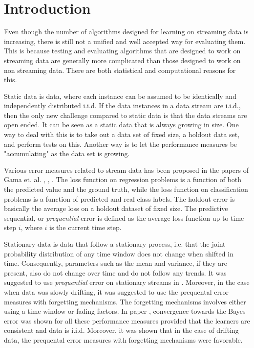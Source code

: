 \section{Introduction}

Even though the number of algorithms designed for learning on streaming data is increasing, there is still not a unified and well accepted way for evaluating them.  This is because testing and evaluating algorithms that are designed to work on streaming data are generally more complicated than those designed to work on non streaming data.  There are both statistical and computational reasons for this.  

Static data is data, where each instance can be assumed to be identically and independently distributed i.i.d. 
If the data instances in a data stream are i.i.d., then the only new challenge compared to static data is that the data streams are open ended.  It can be seen as a static data that is always growing in size.  One way to deal with this is to take out a data set of fixed size, a holdout data set, and perform tests on this.  Another way is to let the performance measures be "accumulating" as the data set is growing.  

Various error measures related to stream data has been proposed in the papers of Gama et. al. \cite{Gam09}, \cite{Gam09_2}, \cite{Gam13}.  The loss function on regression problems is a function of both the predicted value and the ground truth, while the loss function on classification problems is a function of predicted and real class labels.  The holdout error is basically the average loss on a holdout dataset of fixed size.  The predictive sequential, or \emph{prequential} error is defined as the average loss function up to time step $i$, where $i$ is the current time step. 

Stationary data is data that follow a stationary process, i.e. that the joint probability distribution of any time window does not change when shifted in time. Consequently, parameters such as the mean and variance, if they are present, also do not change over time and do not follow any trends.  It was suggested to use  \emph{prequential} error on stationary streams in \cite{Gam13}.  Moreover, in the case when data was slowly drifting, it was suggested to use the prequental error measures with forgetting mechanisms. The forgetting mechanisms involves either using a time window or fading factors.  In paper \cite{Gam13}, convergence towards the Bayes error was shown for all these performance measures provided that the learners are consistent and data is i.i.d.  Moreover, it was shown that in the case of drifting data, the prequental error measures with forgetting mechanisms were favorable.

